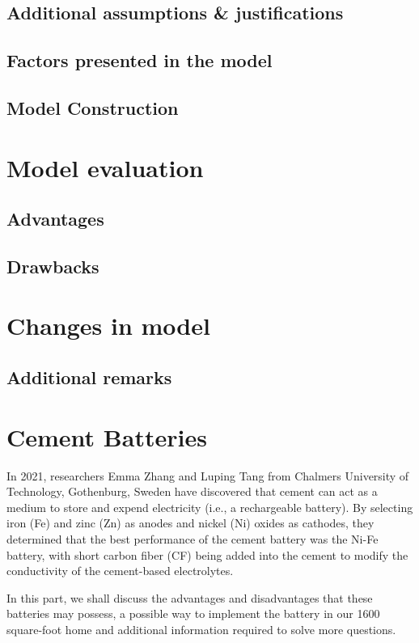 \documentclass[12pt]{article}
\begin{document}
\subsection{Additional assumptions \& justifications}

\subsection{Factors presented in the model}

\subsection{Model Construction}


\section{Model evaluation}
\subsection{Advantages}

\subsection{Drawbacks}


\section{Changes in model}

\subsection{Additional remarks}


\section{Cement Batteries}
In 2021, researchers Emma Zhang and Luping Tang from Chalmers University of Technology, Gothenburg, Sweden\cite{buildings11030103} have discovered that cement can act as a medium to store and expend electricity (i.e., a rechargeable battery). By selecting iron (Fe) and zinc (Zn) as anodes and nickel (Ni) oxides as cathodes, they determined that the best performance of the cement battery was the Ni-Fe battery, with short carbon fiber (CF) being added into the cement to modify the conductivity of the cement-based electrolytes.

In this part, we shall discuss the advantages and disadvantages that these batteries may possess, a possible way to implement the battery in our 1600 square-foot home and additional information required to solve more questions.
\end{document}
